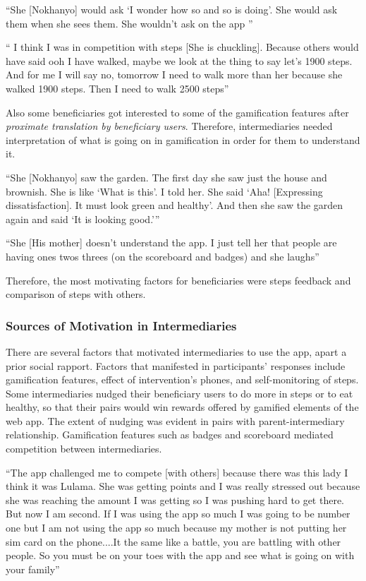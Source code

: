  {``She [Nokhanyo] would ask `I wonder how so and so is doing'. She would ask them when she sees them. She wouldn't ask on the app ''}

{`` I think I was in competition with steps [She is chuckling]. Because others would have said ooh I have walked, maybe we look at the thing to say let’s 1900 steps. And for me I will say no, tomorrow I need to walk more than her because she walked 1900 steps. Then I need to walk 2500 steps''} 

Also some beneficiaries got interested to some of the gamification features after \emph{proximate translation by beneficiary users}. Therefore, intermediaries needed interpretation of what is going on in gamification in order for them to understand it.

 {``She [Nokhanyo] saw the garden. The
first day she saw just the house and brownish. She
is like `What is this'. I told her. She said `Aha! [Expressing
dissatisfaction]. It must look green and healthy'. And then
she saw the garden again and said `It is looking good.'''}  

 {``She [His mother] doesn't understand the app. I just tell her that people are having ones twos threes (on the scoreboard and badges) and she laughs''} 

Therefore, the most motivating factors for beneficiaries were steps feedback and comparison of steps with others. 
\subsubsection{Sources of Motivation in Intermediaries}
There are several factors that motivated intermediaries to use the app, apart a prior social rapport. Factors that manifested in participants' responses include gamification features, effect of intervention's phones, and self-monitoring of steps. Some intermediaries nudged their beneficiary
users to do more in steps or to eat healthy, so that their pairs would win rewards offered by gamified elements of the web app. The extent of nudging was evident in pairs with parent-intermediary relationship. Gamification features such as badges and scoreboard mediated competition between intermediaries.

{``The app challenged me to compete [with others] because there was this lady I think it was Lulama. She was getting points and I was really stressed out because she was reaching the amount I was getting so I was pushing hard to get there. But now I am second. If I was using the app so much I was going to be number one but I am not using the app so much because my mother is not putting her sim card on the phone....It the same like a battle, you are battling with other people. So you must be on your toes with the app and see what is going on with your family''}

